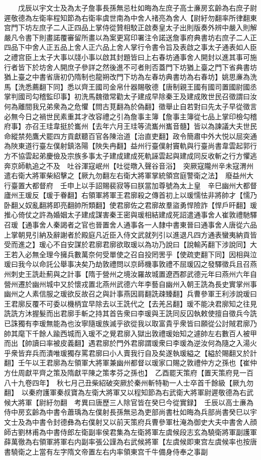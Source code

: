 　　戊辰以宇文士及為太子詹事長孫無忌杜如晦為左庶子高士亷房玄齡為右庶子尉遲敬德為左衛率程知節為右衛率虞世南為中舍人禇亮為舍人【尉紆勿翻率所律翻東宫門下坊左庶子二人正四品上掌侍從贊相駮正啟奏皇太子出則版奏外辨中嚴入則解嚴凡令書下則畫諾覆審留所畫以為案更寫印署注令諾送詹事府典書坊右庶子二人正四品下中舍人正五品上舍人正六品上舍人掌行令書令旨及表啟之事太子通表如人臣之禮宫臣上太子大事以牋小事以啟其封題皆曰上右春坊通事舍人開封以進其事可施行者皆下於坊舍人開庶子參詳之然後進不可者則否蓋門下坊猶上臺之門下省典書坊猶上臺之中書省唐初仍隋制也龍朔改門下坊為左春坊典書坊為右春坊】姚思亷為洗馬【洗悉薦翻下同】悉以齊王國司金帛什器賜敬德【唐制親王國有國司置國尉國丞掌判國司勾稽監印事】初洗馬魏徵常勸太子建成早除秦王及建成敗世民召徵謂曰汝何為離間我兄弟衆為之危懼【問古莧翻為於偽翻】徵舉止自若對曰先太子早從徵言必無今日之禍世民素重其才改容禮之引為詹事主簿【詹事主簿從七品上掌印檢勾稽府事】亦召王珪韋挺於巂州【去年六月王珪等流巂州巂音髓】皆以為諫議大夫世民命縱禁苑鷹犬罷四方貢獻聽百官各陳治道【治直吏翻】政令簡肅中外大悦以屈突通為陜東道行臺左僕射鎮洛陽【陜失冉翻】益州行臺僕射竇軌與行臺尚書韋雲起郭行方不協雲起弟慶儉及宗族多事太子建成建成死軌誣雲起與建成同反收斬之行方懼逃奔京師軌追之不及　吐谷渾寇岷州【吐從暾入聲谷音浴】　突厥寇隴州辛未寇渭州遣右衛大將軍柴紹擊之【厥九勿翻左右衛大將軍掌統領宫庭警衛之法】　廢益州大行臺置大都督府　壬申上以手詔賜裴寂等曰朕當加尊號為太上皇　辛巳幽州大都督廬州王瑗反【瑗于眷翻】右領軍將軍王君廓殺之傳首初上以瑗懦怯非將帥才【懦乃卧翻乂奴亂翻將即亮翻帥所類翻】使君廓佐之君廓故羣盜勇悍險詐【悍戶旰翻】瑗推心倚仗之許為婚姻太子建成謀害秦王密與瑗相結建成死詔遣通事舍人崔敦禮馳驛召瑗【通事舍人秦謁者之官也晉置舍人通事各一人隸中書東晉曰通事舍人唐從六品上掌朝見引納及辭謝者於殿庭凡近臣入侍文武就列引以進退凡四方通表蠻夷納貢皆受而進之】瑗心不自安謀於君廓君廓欲取瑗以為功乃說曰【說輸芮翻下涉說同】大王若入必無全理今擁兵數萬奈何受單使之召自投罔罟乎【使疏吏翻下同】因相與泣瑗曰我今以命託公舉事决矣乃劫敦禮問以京師機事敦禮不屈瑗囚之發驛徵兵且召燕州刺史王詵赴薊與之計事【隋于營州之境汝羅故城置遼西郡武德元年曰燕州六年自營州遷於幽州城中又於懷戎置北燕州武德六年李藝自幽州入朝王詵為長史實掌州事幽州之人素信服之瑗欲反故召之與計事燕因肩翻詵疎臻翻】兵曹參軍王利涉說瑗曰王君廓反覆不可委以機柄宜早除去以王詵代之【去羌呂翻】瑗不能决君廓知之往見詵詵方沐握髮而出君廓手斬之持其首告衆曰李瑗與王詵同反囚執敕使擅自徵兵今詵已誅獨有李瑗無能為也汝寧隨瑗族滅乎欲從我以取富貴乎衆皆曰願從公討賊君廓乃帥其麾下千餘人踰西城而入瑗不之覺君廓入獄出敦禮瑗始知之遽帥左右數百人被甲而出【帥讀曰率被皮義翻】遇君廓於門外君廓謂瑗衆曰李瑗為逆汝何為隨之入湯火乎衆皆弃兵而潰唯瑗獨存罵君廓曰小人賣我行自及矣遂執瑗縊之【縊於賜翻又於計翻】壬午以王君廓為左領軍大將軍兼幽州都督以瑗家口賜之敦禮仲方之孫也【崔仲方仕周獻平齊之策及隋獻平陳之策孝芬之孫也】　乙酉罷天策府【置天策府見一百八十九卷四年】　秋七月己丑柴紹破突厥於秦州斬特勒一人士卒首千餘級【厥九勿翻】　以秦府護軍秦叔寶為左衛大將軍又以程知節為右武衛大將軍尉遲敬德為右武候大將軍【尉紆勿翻　考異曰唐歷三人除官皆在癸巳今從實録】　壬辰以高士亷為侍中房玄齡為中書令蕭瑀為左僕射長孫無忌為吏部尚書杜如晦為兵部尚書癸巳以宇文士及為中書令封德彝為右僕射又以前天策府兵曹參軍杜淹為御史大夫中書舍人顔師古劉林甫為中書侍郎左衛副率侯君集為左衛將軍左虞候段志玄為驍衛將軍副護軍薛萬徹為右領軍將軍右内副率張公謹為右武候將軍【左虞候即東宫左虞候率也按唐書驍衛之上當有左字隋文帝置左右内率領東宫千牛備身侍奉之事副